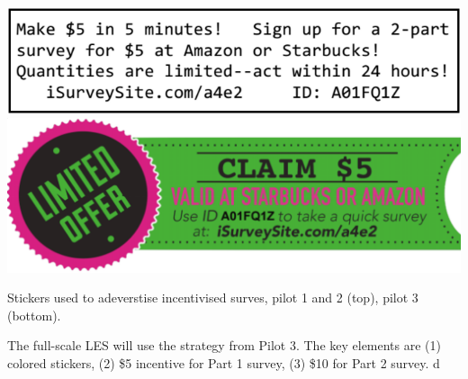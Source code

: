 \documentclass{tufte-handout}
\begin{document}
\begin{marginfigure}[-5 in]%
  \includegraphics[width=\textwidth]{les_sticker_1.png}\\
  \includegraphics[width=.98\textwidth]{les_sticker_2.png}
  \caption{Stickers used to adeverstise incentivised surves, pilot 1 and 2 (top), pilot 3 (bottom).}
  \label{fig:lesstickers}
\end{marginfigure}

The full-scale LES will use the strategy from Pilot 3. The key elements are
(1) colored stickers, (2) \$5 incentive for Part 1 survey, (3) \$10 for Part 2
survey. d
\end{document}
